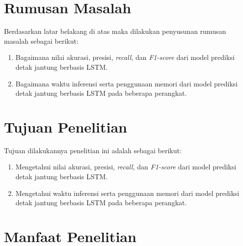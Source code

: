 \section{Rumusan Masalah}

Berdasarkan latar belakang di atas maka dilakukan penyusunan rumusan masalah sebagai berikut:

\begin{enumerate}
  \item Bagaimana nilai akurasi, presisi, \emph{recall}, dan \emph{F1-score} dari model prediksi detak jantung berbasis LSTM.
  \item Bagaimana waktu inferensi serta penggunaan memori dari model prediksi detak jantung berbasis LSTM pada beberapa perangkat.
\end{enumerate}


\section{Tujuan Penelitian}
Tujuan dilakukannya penelitian ini adalah sebagai berikut:

\begin{enumerate}
  \item Mengetahui nilai akurasi, presisi, \emph{recall}, dan \emph{F1-score} dari model prediksi detak jantung berbasis LSTM.
  \item Mengetahui waktu inferensi serta penggunaan memori dari model prediksi detak jantung berbasis LSTM pada beberapa perangkat.
\end{enumerate}


\section{Manfaat Penelitian}

